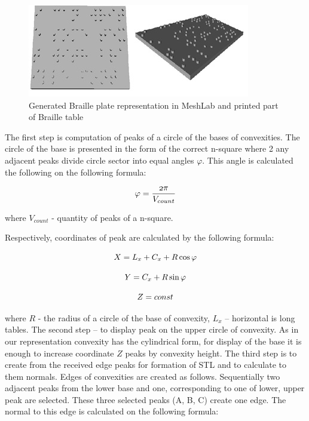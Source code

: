 \documentclass[journal,article,submit,moreauthors,pdftex,10pt,a4paper]{mdpi}
\begin{document}
\begin{figure}[H]
\centering
\includegraphics[width=10 cm]{Plate-3D-view.jpg}
\caption{Generated Braille plate representation in MeshLab and printed part of Braille table}
\end{figure} 

The first step is computation of peaks of a circle of the bases of convexities. The circle of the base is presented in the form of the correct n-square where 2 any adjacent peaks divide circle sector into equal angles $\varphi$. This angle is calculated the following on the following formula:

\begin{equation}
\mathnormal{\varphi=\frac{2\pi}{V_{count}}}
\end{equation}

where $V_{count}$ - quantity of peaks of a n-square.

Respectively, coordinates of peak are calculated by the following formula:

\begin{equation}
\mathnormal{X = L_{x} + C_{x} + R\cos\varphi}
\end{equation}

\begin{equation}
\mathnormal{Y = C_{x} + R\sin\varphi}
\end{equation}

\begin{equation}
\mathnormal{Z = const}
\end{equation}

where $R$ - the radius of a circle of the base of convexity, $L_{x}$ – horizontal is long tables.
The second step – to display peak on the upper circle of convexity. As in our representation convexity has the cylindrical form, for display of the base it is enough to increase coordinate $Z$ peaks by convexity height.
The third step is to create from the received edge peaks for formation of STL and to calculate to them normals. Edges of convexities are created as follows. Sequentially two adjacent peaks from the lower base and one, corresponding to one of lower, upper peak are selected. These three selected peaks (A, B, C) create one edge. The normal to this edge is calculated on the following formula:
\end{document}
